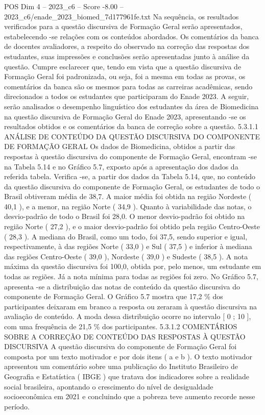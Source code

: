 \begin{textsample}{POS Dim 4 – 2023\_c6 – Score -8.00 – 2023\_c6/enade\_2023\_biomed\_7d177961fe.txt}
Na sequência, os resultados verificados para a questão discursiva de Formação Geral serão apresentados, estabelecendo -se relações com os conteúdos abordados.
Os comentários da banca de docentes avaliadores, a respeito do observado na correção das respostas dos estudantes, suas impressões e conclusões serão apresentadas junto à análise da questão.
Cumpre esclarecer que, tendo em vista que a questão discursiva de Formação Geral foi padronizada, ou seja, foi a mesma em todas as provas, os comentários da banca são os mesmos para todas as carreiras acadêmicas, sendo direcionados a todos os estudantes que participaram do Enade 2023.
A seguir, serão analisados o desempenho linguístico dos estudantes da área de Biomedicina na questão discursiva de Formação Geral do Enade 2023, apresentando -se os resultados obtidos e os comentários da banca de correção sobre a questão. 5.3.1.1 ANÁLISE DE CONTEÚDO DA QUESTÃO DISCURSIVA DO COMPONENTE DE FORMAÇÃO GERAL Os dados de Biomedicina, obtidos a partir das respostas à questão discursiva do componente de Formação Geral, encontram -se na Tabela 5.14 e no Gráfico 5.7, exposto após a apresentação dos dados da referida tabela.
Verifica -se, a partir dos dados da Tabela 5.14, que, no conteúdo da questão discursiva do componente de Formação Geral, os estudantes de todo o Brasil obtiveram média de 38,7.
A maior média foi obtida na região Nordeste ( 40,1 ), e a menor, na região Norte ( 34,9 ).
Quanto à variabilidade das notas, o desvio-padrão de todo o Brasil foi 28,0.
O menor desvio-padrão foi obtido na região Norte ( 27,2 ), e o maior desvio-padrão foi obtido pela região Centro-Oeste ( 28,3 ).
A mediana do Brasil, como um todo, foi 37,5, sendo superior e igual, respectivamente, à das regiões Norte ( 33,0 ) e Sul ( 37,5 ) e inferior à mediana das regiões Centro-Oeste ( 39,0 ), Nordeste ( 39,0 ) e Sudeste ( 38,5 ).
A nota máxima da questão discursiva foi 100,0, obtida por, pelo menos, um estudante em todas as regiões.
Já a nota mínima para todas as regiões foi zero.
No Gráfico 5.7, apresenta -se a distribuição das notas de conteúdo da questão discursiva do componente de Formação Geral.
O Gráfico 5.7 mostra que 17,2 \% dos participantes deixaram em branco a resposta ou zeraram à questão discursiva na avaliação de conteúdo.
A moda dessa distribuição ocorre no intervalo [ 0 ; 10 ], com uma frequência de 21,5 \% dos participantes. 5.3.1.2 COMENTÁRIOS SOBRE A CORREÇÃO DE CONTEÚDO DAS RESPOSTAS À QUESTÃO DISCURSIVA A questão discursiva do componente de Formação Geral foi composta por um texto motivador e por dois itens ( a e b ).
O texto motivador apresentou um comentário sobre uma publicação do Instituto Brasileiro de Geografia e Estatística ( IBGE ) que tratava dos indicadores sobre a realidade social brasileira, apontando o crescimento do nível de desigualdade socioeconômica em 2021 e concluindo que a pobreza teve aumento recorde nesse período.

\end{textsample}
